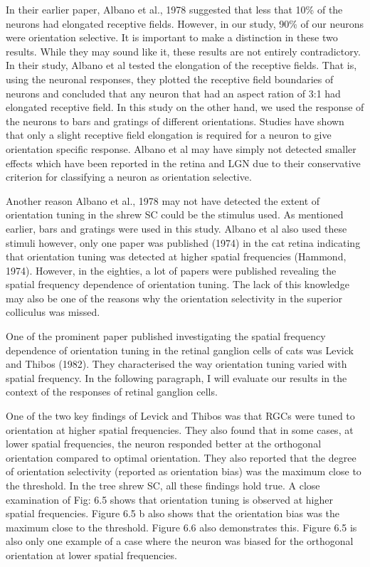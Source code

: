 		In their earlier paper, Albano et al., 1978 suggested that less that 10\% of the neurons had elongated receptive fields. However, in our study, 90\% of our neurons were orientation selective. It is important to make a distinction in these two results. While they may sound like it, these results are not entirely contradictory. In their study, Albano et al tested the elongation of the receptive fields. That is, using the neuronal responses, they plotted the receptive field boundaries of neurons and concluded that any neuron that had an aspect ration of 3:1 had elongated receptive field. In this study on the other hand, we used the response of the neurons to bars and gratings of different orientations. Studies have shown that only a slight receptive field elongation is required for a neuron to give orientation specific response. Albano et al may have simply not detected smaller effects which have been reported in the retina and LGN due to their conservative criterion for classifying a neuron as orientation selective.
		
		Another reason Albano et al., 1978 may not have detected the extent of orientation tuning in the shrew SC could be the stimulus used. As mentioned earlier, bars and gratings were used in this study. Albano et al also used these stimuli however, only one paper was published (1974) in the cat retina indicating that orientation tuning was detected at higher spatial frequencies (Hammond, 1974). However, in the eighties, a lot of papers were published revealing the spatial frequency dependence of orientation tuning. The lack of this knowledge may also be one of the reasons why the orientation selectivity in the superior colliculus was missed.
		
		One of the prominent paper published investigating the spatial frequency dependence of orientation tuning in the retinal ganglion cells of cats was Levick and Thibos (1982). They characterised the way orientation tuning varied with spatial frequency. In the following paragraph, I will evaluate our results in the context of the responses of retinal ganglion cells.
		
		One of the two key findings of Levick and Thibos was that RGCs were tuned to orientation at higher spatial frequencies. They also found that in some cases, at lower spatial frequencies, the neuron responded better at the orthogonal orientation compared to optimal orientation. They also reported that the degree of orientation selectivity (reported as orientation bias) was the maximum close to the threshold. In the tree shrew SC, all these findings hold true. A close examination of Fig: 6.5 shows that orientation tuning is observed at higher spatial frequencies. Figure 6.5 b also shows that the orientation bias was the maximum close to the threshold. Figure 6.6 also demonstrates this. Figure 6.5 is also only one example of a case where the neuron was biased for the orthogonal orientation at lower spatial frequencies. 
		
